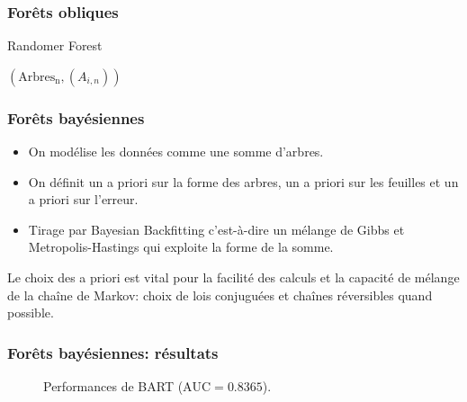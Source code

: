 \documentclass[dvipsnames,10pt]{beamer}
\theoremstyle{plain}
\theoremstyle{definition}
\begin{document}
\begin{frame}[fragile]
\frametitle{Forêts obliques}
\begin{algorithm}[H]
\caption{Randomer Forest} \label{randomer.forest.alg}
\begin{algorithmic}
        \EndFor
    \EndFor
    \State \Return $\left(\mathrm{Arbres_n},\left( A_{i,n} \right) \right)$
    \EndProcedure
\end{algorithmic}    
\end{algorithm}
\end{frame}

\begin{frame}
\frametitle{Forêts bayésiennes}
\begin{itemize}
    \item On modélise les données comme une somme d'arbres.
    \item On définit un a priori sur la forme des arbres, un a priori sur les feuilles et un a priori sur l'erreur.
    \item Tirage par Bayesian Backfitting c'est-à-dire un mélange de Gibbs et Metropolis-Hastings qui exploite la forme de la somme.
\end{itemize}

Le choix des a priori est vital pour la facilité des calculs et la capacité de mélange de la chaîne de Markov: choix de lois conjuguées et chaînes réversibles quand possible.
\end{frame}

\begin{frame}
\frametitle{Forêts bayésiennes: résultats}
\begin{figure}[H]
\centering
    \caption{Performances de BART ($\mathrm{AUC} = 0.8365$).}
\end{figure}
\end{frame}
\end{document}
